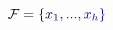 \documentclass[12pt]{article}
\begin{document}
\makeatletter
\renewcommand*{\@textcolor}[3]{%
  \protect\leavevmode
  \begingroup
    \color#1{#2}#3%
  \endgroup
}
\makeatother
\begin{displaymath}
\mathcal { \mathcolor[RGB]{0,0,15}{F} } \mathcolor[RGB]{0,0,30}{=} \mathcolor[RGB]{0,0,45}{\left\{} \mathcolor[RGB]{0,0,60}{x} _ { \mathcolor[RGB]{0,0,75}{1} } \mathcolor[RGB]{0,0,90}{,} \mathcolor[RGB]{0,0,105}{.} \mathcolor[RGB]{0,0,120}{.} \mathcolor[RGB]{0,0,135}{.} \mathcolor[RGB]{0,0,150}{,} \mathcolor[RGB]{0,0,165}{x} _ { \mathcolor[RGB]{0,0,180}{h} } \mathcolor[RGB]{0,0,195}{\right\}}
\end{displaymath}
\end{document}
